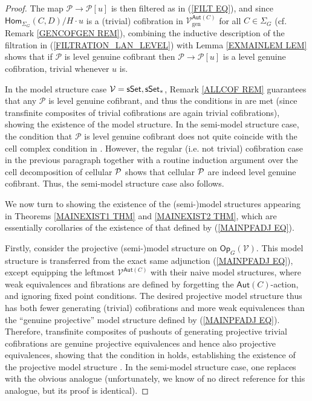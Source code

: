 \documentclass[a4paper,10pt]{article}%
\begin{document}
\begin{proof}
The map $\mathcal{P} \to \mathcal{P}[u]$ is then filtered as in (\ref{FILT EQ}),
and since
$\mathsf{Hom}_{\Sigma_G}(C,D)/H \cdot u$
is a (trivial) cofibration in 
$\mathcal{V}^{\mathsf{Aut}(C)}_{\text{gen}}$
for all $C \in \Sigma_G$ 
(cf. Remark \ref{GENCOFGEN REM}),
combining the inductive description of the filtration in (\ref{FILTRATION_LAN_LEVEL})
with Lemma \ref{EXMAINLEM LEM} shows that if
$\mathcal{P}$ is level genuine cofibrant
then 
$\mathcal{P} \to \mathcal{P}[u]$
is a level genuine cofibration, trivial whenever $u$ is.

In the model structure case 
$\mathcal{V} = \mathsf{sSet},\mathsf{sSet}_{\**}$,
Remark \ref{ALLCOF REM}
guarantees that any 
$\mathcal{P}$ is level genuine cofibrant,
and thus the conditions in
\cite[Thm. 11.3.2]{Hi03} are met (since transfinite composites of trivial cofibrations are again trivial cofibrations),
showing the existence of the model structure.
In the semi-model structure case, the condition that 
$\mathcal{P}$ is level genuine cofibrant
does not quite coincide with the cell complex condition in \cite[Thm. 2.2.2]{WY15}. 
However, the regular (i.e. not trivial) 
cofibration case in the previous paragraph together with a routine induction argument over the cell decomposition of cellular $\P$ shows that cellular  
$\P$ are indeed level genuine cofibrant.
Thus, the semi-model structure case also follows.

We now turn to showing the existence of the (semi-)model structures appearing in Theorems \ref{MAINEXIST1 THM} and \ref{MAINEXIST2 THM},
which are essentially corollaries 
of the existence of that defined by
(\ref{MAINPFADJ EQ}).

Firstly, consider the projective (semi-)model structure
on $\mathsf{Op}_G(\mathcal{V})$.
This model structure is transferred from the exact same adjunction
(\ref{MAINPFADJ EQ}), except equipping the 
leftmost $\mathcal{V}^{\mathsf{Aut}(C)}$
with their naive model structures, where weak equivalences and fibrations are defined by forgetting the $\mathsf{Aut}(C)$-action,
and ignoring fixed point conditions.
The desired projective model structure thus
has both fewer generating (trivial) cofibrations
and more weak equivalences than the ``genuine projective'' model structure defined by (\ref{MAINPFADJ EQ}).
Therefore, transfinite composites of pushouts of generating projective trivial cofibrations 
are genuine projective equivalences and hence also projective equivalences, showing that the condition in 
\cite[Thm. 11.3.2(2)]{Hi03}
holds,
establishing the existence of the projective model structure
. 
In the semi-model structure case,
one replaces \cite[Thm. 11.3.2(2)]{Hi03}
with the obvious analogue (unfortunately, we know of no direct reference for this analogue, but its proof is identical).


\end{proof}
\end{document}
